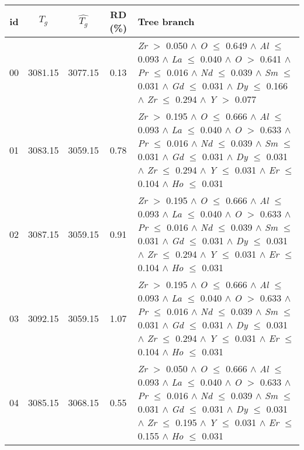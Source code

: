 \begin{table}[!htbp]
	\setlength{\tabcolsep}{3pt}
	\begin{tabular}{ccccm{}}
		\toprule
		id & $T_g$ & $\hat{T_g}$ & RD (\%) & Tree branch\\
		\midrule
		00 & 3081.15 & 3077.15 & 0.13 & \textit{Zr} $>$ 0.050 $\wedge$ \textit{O} $\le$ 0.649 $\wedge$ \textit{Al} $\le$ 0.093 $\wedge$ \textit{La} $\le$ 0.040 $\wedge$ \textit{O} $>$ 0.641 $\wedge$ \textit{Pr} $\le$ 0.016 $\wedge$ \textit{Nd} $\le$ 0.039 $\wedge$ \textit{Sm} $\le$ 0.031 $\wedge$ \textit{Gd} $\le$ 0.031 $\wedge$ \textit{Dy} $\le$ 0.166 $\wedge$ \textit{Zr} $\le$ 0.294 $\wedge$ \textit{Y} $>$ 0.077\\
		\hline
		01 & 3083.15 & 3059.15 & 0.78 & \textit{Zr} $>$ 0.195 $\wedge$ \textit{O} $\le$ 0.666 $\wedge$ \textit{Al} $\le$ 0.093 $\wedge$ \textit{La} $\le$ 0.040 $\wedge$ \textit{O} $>$ 0.633 $\wedge$ \textit{Pr} $\le$ 0.016 $\wedge$ \textit{Nd} $\le$ 0.039 $\wedge$ \textit{Sm} $\le$ 0.031 $\wedge$ \textit{Gd} $\le$ 0.031 $\wedge$ \textit{Dy} $\le$ 0.031 $\wedge$ \textit{Zr} $\le$ 0.294 $\wedge$ \textit{Y} $\le$ 0.031 $\wedge$ \textit{Er} $\le$ 0.104 $\wedge$ \textit{Ho} $\le$ 0.031\\
		\hline
		02 & 3087.15 & 3059.15 & 0.91 & \textit{Zr} $>$ 0.195 $\wedge$ \textit{O} $\le$ 0.666 $\wedge$ \textit{Al} $\le$ 0.093 $\wedge$ \textit{La} $\le$ 0.040 $\wedge$ \textit{O} $>$ 0.633 $\wedge$ \textit{Pr} $\le$ 0.016 $\wedge$ \textit{Nd} $\le$ 0.039 $\wedge$ \textit{Sm} $\le$ 0.031 $\wedge$ \textit{Gd} $\le$ 0.031 $\wedge$ \textit{Dy} $\le$ 0.031 $\wedge$ \textit{Zr} $\le$ 0.294 $\wedge$ \textit{Y} $\le$ 0.031 $\wedge$ \textit{Er} $\le$ 0.104 $\wedge$ \textit{Ho} $\le$ 0.031\\
		\hline
		03 & 3092.15 & 3059.15 & 1.07 & \textit{Zr} $>$ 0.195 $\wedge$ \textit{O} $\le$ 0.666 $\wedge$ \textit{Al} $\le$ 0.093 $\wedge$ \textit{La} $\le$ 0.040 $\wedge$ \textit{O} $>$ 0.633 $\wedge$ \textit{Pr} $\le$ 0.016 $\wedge$ \textit{Nd} $\le$ 0.039 $\wedge$ \textit{Sm} $\le$ 0.031 $\wedge$ \textit{Gd} $\le$ 0.031 $\wedge$ \textit{Dy} $\le$ 0.031 $\wedge$ \textit{Zr} $\le$ 0.294 $\wedge$ \textit{Y} $\le$ 0.031 $\wedge$ \textit{Er} $\le$ 0.104 $\wedge$ \textit{Ho} $\le$ 0.031\\
		\hline
		04 & 3085.15 & 3068.15 & 0.55 & \textit{Zr} $>$ 0.050 $\wedge$ \textit{O} $\le$ 0.666 $\wedge$ \textit{Al} $\le$ 0.093 $\wedge$ \textit{La} $\le$ 0.040 $\wedge$ \textit{O} $>$ 0.633 $\wedge$ \textit{Pr} $\le$ 0.016 $\wedge$ \textit{Nd} $\le$ 0.039 $\wedge$ \textit{Sm} $\le$ 0.031 $\wedge$ \textit{Gd} $\le$ 0.031 $\wedge$ \textit{Dy} $\le$ 0.031 $\wedge$ \textit{Zr} $\le$ 0.195 $\wedge$ \textit{Y} $\le$ 0.031 $\wedge$ \textit{Er} $\le$ 0.155 $\wedge$ \textit{Ho} $\le$ 0.031\\

\end{tabular}
\end{table}
